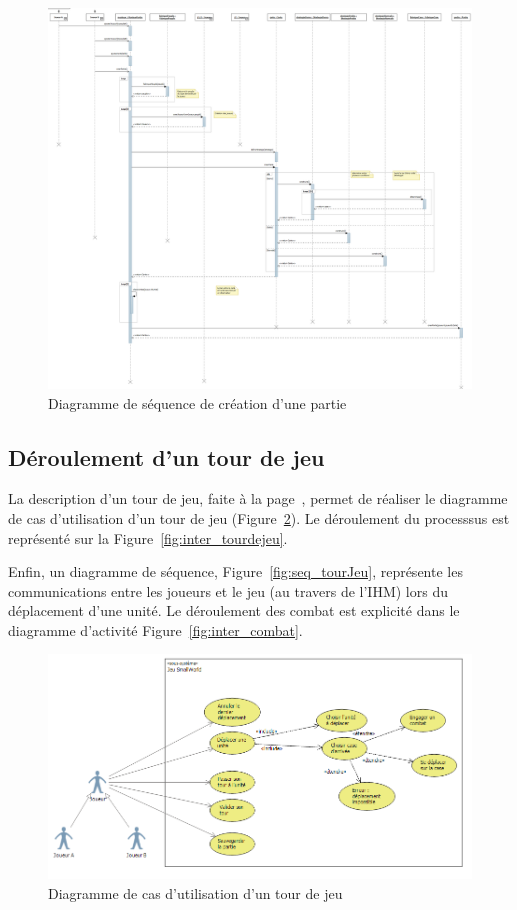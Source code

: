 \documentclass[a4paper]{article}%
\begin{document}
\begin{figure}[H]
   \centering
   \includegraphics[width=\textwidth]{./images/sequence/creerpartie.png}
		\caption{Diagramme de séquence de création d'une partie}
		\label{fig:seq_creerpartie}
\end{figure}


\subsection{Déroulement d'un tour de jeu}
La description d'un tour de jeu, faite à la page~\pageref{tourdejeu}, permet de réaliser le diagramme de cas d'utilisation d'un tour de jeu (Figure~\ref{fig:cas_tourdejeu}). Le déroulement du processsus est représenté sur la Figure~\ref{fig:inter_tourdejeu}.

Enfin, un diagramme de séquence, Figure~\ref{fig:seq_tourJeu}, représente les communications entre les joueurs et le jeu (au travers de l'IHM) lors du déplacement d'une unité. Le déroulement des combat est explicité dans le diagramme d'activité Figure~\ref{fig:inter_combat}.

\begin{figure}[H]
    \centering
    \includegraphics[width=\textwidth]{./images/cas_dutilisation/tourdejeu.png}
		\caption{Diagramme de cas d'utilisation d'un tour de jeu}
		\label{fig:cas_tourdejeu}
\end{figure}
\end{document}
